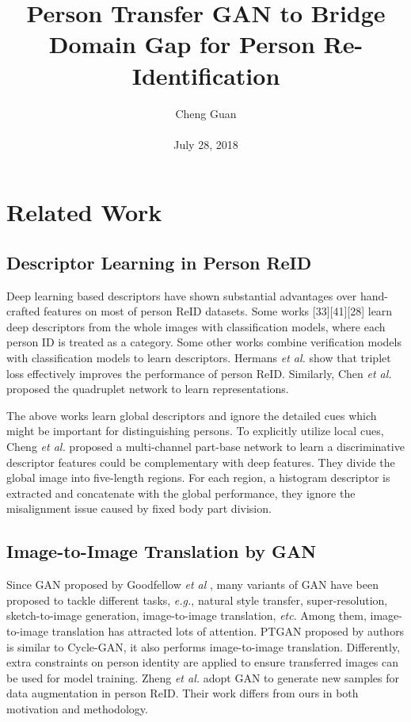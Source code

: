 \documentclass[10pt,twocolumn,letterpaper]{article}
\title{Person Transfer GAN to Bridge Domain Gap for Person Re-Identification}
\author{Cheng Guan\\\\
July 28, 2018}
\begin{document}
\maketitle
\section{Related Work}
\subsection{Descriptor Learning in Person ReID}
Deep learning based descriptors have shown substantial advantages over 
hand-crafted features on most of person ReID datasets. Some works [33][41][28] learn deep descriptors from the whole images with classification models, where each person ID is treated as a category. Some other works combine verification models with classification models to learn descriptors. Hermans \emph{et al.} \cite{hermans2017defense} 
show that triplet loss effectively improves the performance of person ReID. Similarly, Chen \emph{et al.} \cite{chen2017beyond} proposed the quadruplet network to learn representations.
\par
The above works learn global descriptors and ignore the detailed cues which might be important for distinguishing persons. To explicitly utilize local cues, Cheng \emph{et al.} proposed a multi-channel part-base network to learn a discriminative descriptor features could be complementary with deep features. They divide the global image into five-length regions. For each region, a histogram descriptor is extracted and concatenate with the global performance, they ignore the misalignment issue caused by fixed body part division.
\par
\subsection{Image-to-Image Translation by GAN}
Since GAN proposed by Goodfellow \emph{et al} \cite{goodfellow2014generative}, many variants of GAN have been proposed to tackle different tasks, \textit{e.g.}, natural style transfer, super-resolution, sketch-to-image generation, image-to-image translation, \textit{etc}. Among them, image-to-image translation has attracted lots of attention. PTGAN proposed by authors is similar to Cycle-GAN, it also performs image-to-image translation. Differently, extra constraints on person identity are applied to ensure transferred images can be used for model training. Zheng \emph{et al.} \cite{zheng2017unlabeled} adopt 
GAN to generate new samples for data augmentation in person ReID. Their work differs from ours in both motivation and methodology. 
\end{document}
